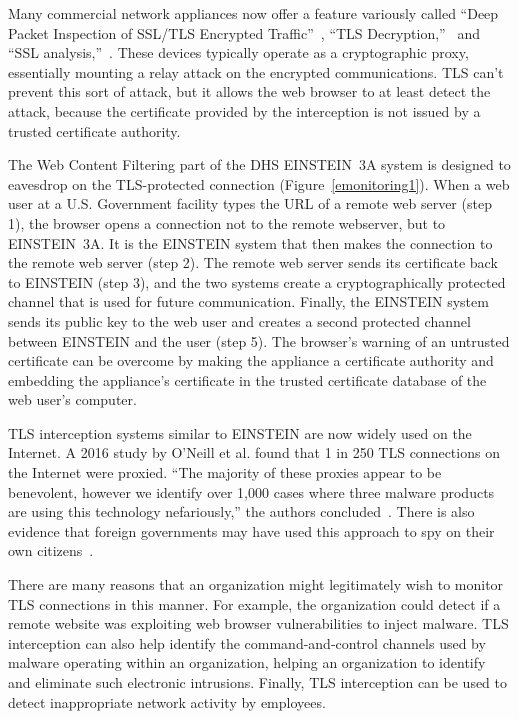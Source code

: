 \documentclass[fleqn,10pt]{wlscirep}
\begin{document}
Many commercial network appliances now offer a feature variously
called ``Deep Packet Inspection of SSL/TLS Encrypted
Traffic''~\cite{sonicwall}, ``TLS Decryption,''~\cite{paloalto} and
``SSL analysis,''~\cite{globalsign}. These devices typically operate
as a cryptographic proxy, essentially mounting a relay attack on the
encrypted communications. TLS can't prevent this sort of attack, but
it allows the web browser to at least detect the attack, because the
certificate provided by the interception is not issued by a trusted
certificate authority.

The Web Content Filtering part of the DHS EINSTEIN~3A system
is designed to eavesdrop on the TLS-protected connection 
(Figure~\ref{emonitoring1}). When a web user at a U.S. Government
facility types  the URL of a remote web server (step 1), the browser opens a
connection not to the remote webserver, but to EINSTEIN~3A. It is the
EINSTEIN system that then makes the connection to the remote web
server (step 2). The remote web server sends its certificate back to
EINSTEIN (step 3), and the two systems create a cryptographically
protected channel that is used for future communication.
Finally, the EINSTEIN system sends its public key to the web user and
creates a second protected channel between EINSTEIN and the user (step
5). The browser's warning of an untrusted certificate can be overcome
by making the appliance a certificate authority and embedding the
appliance's certificate in the trusted certificate database of the web 
user's computer.

TLS interception systems similar to EINSTEIN are now widely used on the Internet.
A 2016 study by O'Neill et al. found that 1 in 250 TLS
connections on the Internet were proxied. ``The majority of these proxies appear to be benevolent,
however we identify over 1,000 cases where three malware
products are using this technology nefariously,'' the authors
concluded~\cite{DBLP:conf/imc/ONeillRSZ16}. There is also evidence
that foreign governments may have used this approach to spy on their
own citizens~\cite{fox-it-black-tulip}.

There are many reasons that an organization might legitimately wish to
monitor TLS connections in this manner. For example, the organization
could detect if a remote website was exploiting web browser
vulnerabilities to inject malware. TLS interception can also help
identify the command-and-control channels used by malware operating
within an organization, helping an organization to identify and
eliminate such electronic intrusions. Finally, TLS interception can be
used to detect inappropriate network activity by employees.
\end{document}
